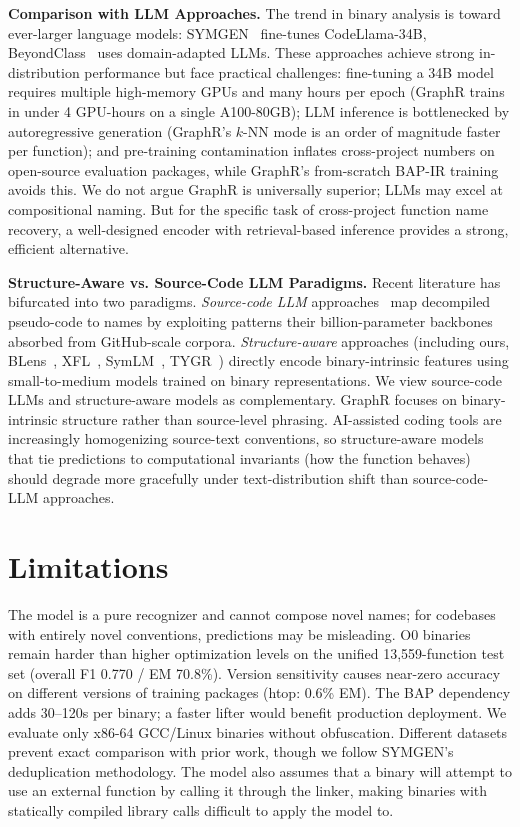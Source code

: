 \documentclass[sigconf,nonacm]{acmart}
\newcommand{\sysname}{\textsf{GraphR}}
\begin{document}
\textbf{Comparison with LLM Approaches.}
The trend in binary analysis is toward ever-larger language models: SYMGEN~\cite{symgen} fine-tunes CodeLlama-34B, BeyondClass~\cite{beyondclass} uses domain-adapted LLMs. These approaches achieve strong in-distribution performance but face practical challenges: fine-tuning a 34B model requires multiple high-memory GPUs and many hours per epoch (\sysname{} trains in under 4 GPU-hours on a single A100-80GB); LLM inference is bottlenecked by autoregressive generation (\sysname{}'s $k$-NN mode is an order of magnitude faster per function); and pre-training contamination inflates cross-project numbers on open-source evaluation packages, while \sysname{}'s from-scratch BAP-IR training avoids this. We do not argue \sysname{} is universally superior; LLMs may excel at compositional naming. But for the specific task of cross-project function name recovery, a well-designed encoder with retrieval-based inference provides a strong, efficient alternative.

\textbf{Structure-Aware vs. Source-Code LLM Paradigms.}
Recent literature has bifurcated into two paradigms. \emph{Source-code LLM} approaches~\cite{symgen,beyondclass} map decompiled pseudo-code to names by exploiting patterns their billion-parameter backbones absorbed from GitHub-scale corpora. \emph{Structure-aware} approaches (including ours, BLens~\cite{blens}, XFL~\cite{xfl}, SymLM~\cite{symlm}, TYGR~\cite{tygr}) directly encode binary-intrinsic features using small-to-medium models trained on binary representations. We view source-code LLMs and structure-aware models as complementary. \sysname{} focuses on binary-intrinsic structure rather than source-level phrasing. AI-assisted coding tools are increasingly homogenizing source-text conventions, so structure-aware models that tie predictions to computational invariants (how the function behaves) should degrade more gracefully under text-distribution shift than source-code-LLM approaches.


\section{Limitations}
\label{sec:limitations}

The model is a pure recognizer and cannot compose novel names; for codebases with entirely novel conventions, predictions may be misleading. O0 binaries remain harder than higher optimization levels on the unified 13,559-function test set (overall F1 0.770 / EM 70.8\%). Version sensitivity causes near-zero accuracy on different versions of training packages (htop: 0.6\% EM). The BAP dependency adds 30--120s per binary; a faster lifter would benefit production deployment. We evaluate only x86-64 GCC/Linux binaries without obfuscation. Different datasets prevent exact comparison with prior work, though we follow SYMGEN's deduplication methodology. The model also assumes that a binary will attempt to use an external function by calling it through the linker, making binaries with statically compiled library calls difficult to apply the model to.
\end{document}

